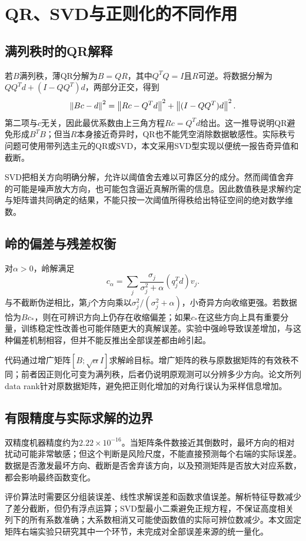 \section{QR、SVD与正则化的不同作用}
\subsection{满列秩时的QR解释}
若$B$满列秩，薄QR分解为$B=QR$，其中$Q^TQ=I$且$R$可逆。将数据分解为$QQ^Td+(I-QQ^T)d$，两部分正交，得到
\[
\left\lVert Bc-d\right\rVert^2=\left\lVert Rc-Q^Td\right\rVert^2+\left\lVert(I-QQ^T)d\right\rVert^2.
\]
第二项与$c$无关，因此最优系数由上三角方程$Rc=Q^Td$给出。这一推导说明QR避免形成$B^TB$；但当$R$本身接近奇异时，QR也不能凭空消除数据敏感性。实际秩亏问题可使用带列选主元的QR或SVD，本文采用SVD型实现以便统一报告奇异值和截断。

SVD把相关方向明确分解，允许以阈值舍去难以可靠区分的成分。然而阈值舍弃的可能是噪声放大方向，也可能包含逼近真解所需的信息。因此数值秩是求解约定与矩阵谱共同确定的结果，不能只按一次阈值所得秩给出特征空间的绝对数学维数。

\subsection{岭的偏差与残差权衡}
对$\alpha>0$，岭解满足
\[
c_\alpha=\sum_j\frac{\sigma_j}{\sigma_j^2+\alpha}(q_j^Td)v_j.
\]
与不截断伪逆相比，第$j$个方向乘以$\sigma_j^2/(\sigma_j^2+\alpha)$，小奇异方向收缩更强。若数据恰为$Bc_*$，则在可辨识方向上仍存在收缩偏差；如果$c_*$在这些方向上具有重要分量，训练稳定性改善也可能伴随更大的真解误差。实验中强岭导致误差增加，与这种偏差机制相容，但并不能反推出全部误差都由岭引起。

代码通过增广矩阵$[B;\sqrt\alpha I]$求解岭目标。增广矩阵的秩与原数据矩阵的有效秩不同；前者因正则化可变为满列秩，后者仍说明原观测可以分辨多少方向。论文所列data rank针对原数据矩阵，避免把正则化增加的对角行误认为采样信息增加。

\subsection{有限精度与实际求解的边界}
双精度机器精度约为$2.22\times10^{-16}$。当矩阵条件数接近其倒数时，最坏方向的相对扰动可能非常敏感；但这个判断是风险尺度，不能直接预测每个右端的实际误差。数据是否激发最坏方向、截断是否舍弃该方向，以及预测矩阵是否放大对应系数，都会影响最终函数变化。

评价算法时需要区分组装误差、线性求解误差和函数求值误差。解析特征导数减少了差分截断，但仍有浮点运算；SVD型最小二乘避免正规方程，不保证高度相关列下的所有系数准确；大系数相消又可能使函数值的实际可辨位数减少。本文固定矩阵右端实验只研究其中一个环节，未完成对全部误差来源的统一量化。

